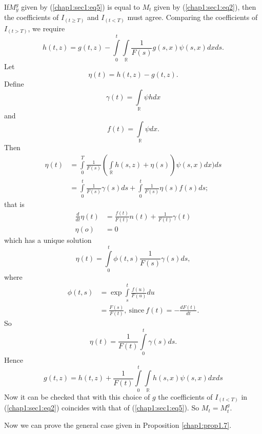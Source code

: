 If\pageoriginale $M^g_y$ given by (\ref{chap1:sec1:eq5}) is equal to
$M_t$ given by (\ref{chap1:sec1:eq2}), then the coefficients of $I_{(t
  \ge T)}$ and $I_{(t < T)}$ must agree. Comparing the coefficients of
$I_{(t > T)}$, we require    
$$
h(t,z) = g(t,z) - \int \limits^t_0 \int \limits_{\mathbb{R}}
\frac{1}{F(s)} g(s,x) \psi (s,x)dx ds.  
$$
Let 
$$
\eta(t) = h (t,z) - g(t,z).
$$
Define
$$
\gamma(t) =  \int \limits_{\mathbb{R}} \psi h dx
$$
and  
$$ 
f(t) =  \int \limits_{\mathbb{R}} \psi dx.
$$
Then
\begin{align*}
  \eta(t) & = \int \limits^T_0 \frac{1}{F(s)} \left(\int \limits_{\mathbb{R}} h
  (s,z) + \eta (s)\right) \psi (s,x)dx) ds \\ 
  & = \int \limits^t_0 \frac{1}{F(s)} \gamma(s)ds + \int \limits^t_0
  \frac{1}{F(s)} \eta(s)f(s)ds; 
\end{align*}
that is 
\begin{align*}
  \frac{d}{dt} \eta(t)&  = \frac{f(t)}{F(t)} n(t) + \frac{1}{F(t)}
  \gamma (t) \\ 
  \eta(o) & = 0
\end{align*}
which has a unique solution
$$
\eta(t) = \int \limits^t_0 \phi (t,s) \frac{1}{F(s)} \gamma(s)ds,
$$
where
\begin{align*}
\phi(t,s) & = \exp \int \limits^t_s \frac{f(u)}{F(u)} du \\
& = \frac{F(s)}{F(t)}, ~\text{since}~ f(t) = - \frac{dF(t)}{dt}.
\end{align*}
So\pageoriginale 
$$
\eta(t) = \frac{1}{F(t)} \int \limits^t_0 \gamma(s)ds.
$$
Hence 
\begin{equation*}
  g(t,z) = h(t,z) + \frac{1}{F(t)} \int \limits^t_0  \int
  \limits_{\mathbb{R}} h(s,x) \psi (s,x)dx ds \tag{6}\label{chap1:sec1:eq6} 
\end{equation*}
Now it can be checked that with this choice of $g$ the coefficients of
$I_{(t < T)}$ in (\ref{chap1:sec1:eq2}) coincides with that of
(\ref{chap1:sec1:eq5}). So $M_t = M^g_t$. 

Now we can prove the general case given in Proposition
\ref{chap1:prop1.7}. 




